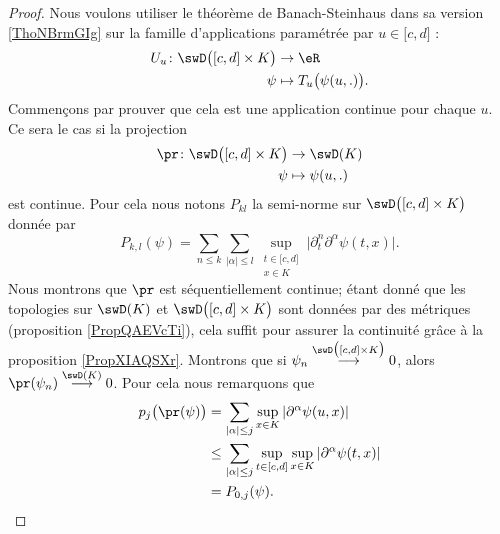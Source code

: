 \begin{proof}
    Nous voulons utiliser le théorème de Banach-Steinhaus dans sa version \ref{ThoNBrmGIg} sur la famille d'applications paramétrée par \( u\in\mathopen[ c , d \mathclose]\) :
    \begin{equation}        \label{EqBEKoqMb}
        \begin{aligned}
            U_u\colon \swD\big( \mathopen[ c , d \mathclose]\times K \big)&\to \eR \\
            \psi&\mapsto T_u\big( \psi(u,.) \big). 
        \end{aligned}
    \end{equation}
    Commençons par prouver que cela est une application continue pour chaque \( u\). Ce sera le cas si la projection
    \begin{equation}
        \begin{aligned}
            \pr\colon \swD\big( \mathopen[ c , d \mathclose]\times K \big)&\to \swD(K) \\
            \psi&\mapsto \psi(u,.) 
        \end{aligned}
    \end{equation}
    est continue. Pour cela nous notons \( P_{kl}\) la semi-norme sur \( \swD\big( \mathopen[ c , d \mathclose]\times K \big)\) donnée par
    \begin{equation}
        P_{k,l}(\psi)=\sum_{n\leq k}\sum_{| \alpha |\leq l}\sup_{\substack{t\in\mathopen[ c , d \mathclose]\\x\in K}}\big| \partial_t^n\partial^{\alpha}\psi(t,x) \big|.
    \end{equation}
    Nous montrons que \( \pr\) est séquentiellement continue; étant donné que les topologies sur \( \swD(K)\) et \( \swD\big( \mathopen[ c , d \mathclose]\times K \big)\) sont données par des métriques (proposition \ref{PropQAEVcTi}), cela suffit pour assurer la continuité grâce à la proposition \ref{PropXIAQSXr}. Montrons que si \( \psi_n\stackrel{\swD\big( \mathopen[ c , d \mathclose]\times K \big)}{\longrightarrow}0\), alors \( \pr(\psi_n)\stackrel{\swD(K)}{\longrightarrow}0\). Pour cela nous remarquons que
    \begin{subequations}
        \begin{align}
            p_j\big( \pr(\psi) \big)&=\sum_{| \alpha |\leq j}\sup_{x\in K}| \partial^{\alpha}\psi(u,x) |\\
            &\leq \sum_{| \alpha |\leq j}\sup_{t\in\mathopen[ c , d \mathclose]}\sup_{x\in K}| \partial^{\alpha}\psi(t,x) |\\
            &=P_{0,j}(\psi).

\end{align}
\end{subequations}
\end{proof}
